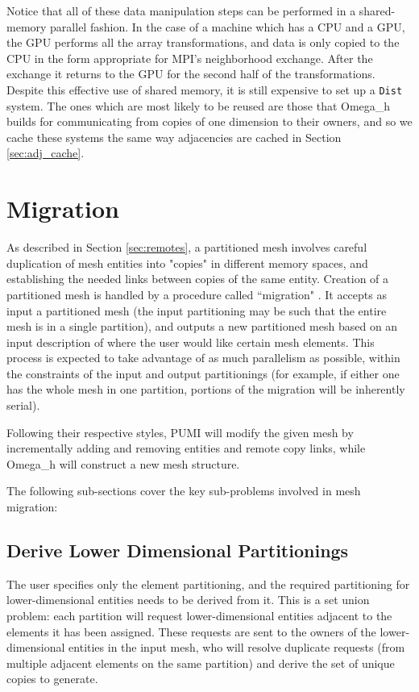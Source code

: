 Notice that all of these data manipulation steps can be performed in
a shared-memory parallel fashion.
In the case of a machine which has a CPU and a GPU, the GPU performs
all the array transformations, and data is only copied to the CPU
in the form appropriate for MPI's neighborhood exchange.
After the exchange it returns to the GPU for the second half of the
transformations.
Despite this effective use of shared memory, it is still expensive
to set up a \texttt{Dist} system.
The ones which are most likely to be reused are those that Omega\_h
builds for communicating from copies of one dimension to their owners,
and so we cache these systems the same way adjacencies are cached
in Section \ref{sec:adj_cache}.

\section{Migration}

As described in Section \ref{sec:remotes}, a partitioned mesh
involves careful duplication of mesh entities into "copies"
in different memory spaces, and establishing the needed
links between copies of the same entity.
Creation of a partitioned mesh is handled by a procedure
called ``migration" \cite{ibanez2015pumi}.
It accepts as input a partitioned mesh (the input partitioning
may be such that the entire mesh is in a single partition),
and outputs a new partitioned mesh based on an input description
of where the user would like certain mesh elements.
This process is expected to take advantage of as much parallelism
as possible, within the constraints of the input and output
partitionings (for example, if either one has the whole mesh
in one partition, portions of the migration will be inherently serial).

Following their respective styles, PUMI will modify the given
mesh by incrementally adding and removing entities and remote
copy links,
while Omega\_h will construct a new mesh structure.

The following sub-sections cover the key sub-problems involved
in mesh migration:

\subsection{Derive Lower Dimensional Partitionings}
\label{sec:migr_down}

The user specifies only the element partitioning, and
the required partitioning for lower-dimensional entities needs to
be derived from it.
This is a set union problem: each partition will request lower-dimensional
entities adjacent to the elements it has been assigned.
These requests are sent to the owners of the lower-dimensional entities
in the input mesh, who will resolve duplicate requests (from multiple
adjacent elements on the same partition) and derive the set
of unique copies to generate.

